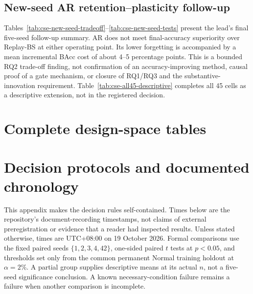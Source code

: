 \documentclass[10pt,twocolumn]{article}
\begin{document}
\subsection{New-seed AR retention--plasticity follow-up}
Tables~\ref{tab:cse-new-seed-tradeoff}--\ref{tab:cse-new-seed-tests} present the lead's final five-seed follow-up summary. AR does not meet final-accuracy superiority over Replay-BS at either operating point. Its lower forgetting is accompanied by a mean incremental BAcc cost of about 4--5 percentage points. This is a bounded RQ2 trade-off finding, not confirmation of an accuracy-improving method, causal proof of a gate mechanism, or closure of RQ1/RQ3 and the substantive-innovation requirement. Table~\ref{tab:cse-all45-descriptive} completes all 45 cells as a descriptive extension, not in the registered decision.

\section{Complete design-space tables}

\section{Decision protocols and documented chronology}\label{app:protocols}
This appendix makes the decision rules self-contained. Times below are the repository's document-recording timestamps, not claims of external preregistration or evidence that a reader had inspected results. Unless stated otherwise, times are UTC+08:00 on 19 October 2026. Formal comparisons use the fixed paired seeds $\{1,2,3,4,42\}$, one-sided paired $t$ tests at $p<0.05$, and thresholds set only from the common permanent Normal training holdout at $\alpha=2\%$. A partial group supplies descriptive means at its actual $n$, not a five-seed significance conclusion. A known necessary-condition failure remains a failure when another comparison is incomplete.
\end{document}
